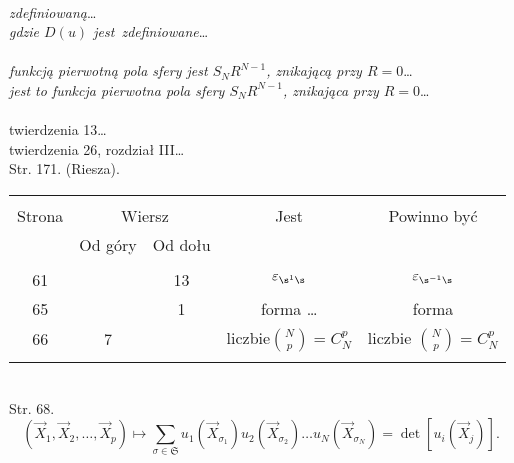 \documentclass[a4paper,11pt]{article}
\newcommand{\veps}{\varepsilon}
\begin{document}
 \\
\Jest \emph{zdefiniowaną}\ldots \\
\Pow \emph{gdzie $D( u )$ jest~zdefiniowane}\ldots \\
 \\
\Jest \emph{funkcją pierwotną pola sfery jest $S_{ N } R^{ N - 1 }$,
  znikającą przy $R = 0$}\ldots \\
\Pow \emph{jest to funkcja pierwotna pola sfery $S_{ N } R^{ N - 1 }$,
  znikająca przy $R = 0$}\ldots \\
 \\
\Jest twierdzenia 13\ldots \\
\Pow twierdzenia 26, rozdział III\ldots \\

\start Str. 171. \large{(Riesza)}.



\newpage







\begin{center}
  \begin{tabular}{|c|c|c|c|c|}
    \hline
    & \multicolumn{2}{c|}{} & & \\
    Strona & \multicolumn{2}{c|}{Wiersz}& Jest & Powinno być \\ \cline{2-3}
    & Od góry & Od dołu &  &  \\ \hline
    & & & & \\
    61 & & 13 & $\veps_{ \s^{ 1 } \s }$ & $\veps_{ \s^{ -1 } \s }$ \\
    65 & & 1 & forma \ldots & forma \\
    66 & 7 & & liczbie${ N\choose p } =  C^{ p }_{ N } $
           & liczbie ${ N\choose p } =  C^{ p }_{ N } $ \\
    & & & & \\ \hline
  \end{tabular}
\end{center}
\noi \\
\start Str. 68.
$$( \vec{ X }_{ 1 }, \vec{ X }_{ 2 }, \ldots, \vec{ X }_{ p })
\mapsto \sum_{\sigma \in \mathfrak{ S } } u_{ 1 }( \vec{ X }_{
  \sigma_{ 1 } } ) u_{ 2 }( \vec{ X }_{ \sigma_{ 2 } } ) \ldots u_{ N
}( \vec{ X }_{ \sigma_{ N } } ) = \det[ u_{ i }( \vec{ X }_{ j } ) ]
\textrm{.}$$
\end{document}
